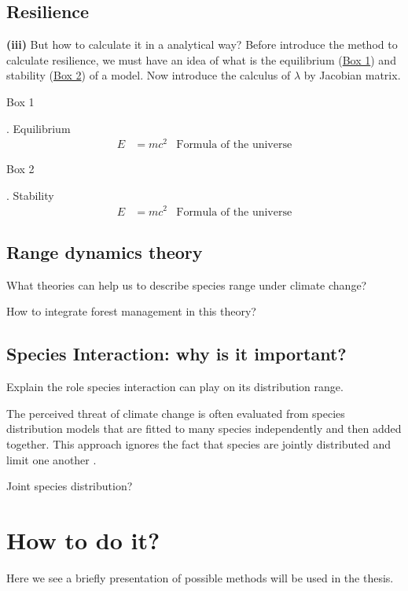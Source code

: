 \subsection*{Resilience}
\textbf{(iii)} But how to calculate it in a analytical way? Before introduce the method to calculate resilience, we must have an idea of what is the equilibrium (\hyperlink{box1}{Box 1}) and stability (\hyperlink{box2}{Box 2}) of a model. Now introduce the calculus of $\lambda$ by Jacobian matrix.

\begin{tcolorbox}
\hypertarget{box1}{Box 1}. Equilibrium
\begin{align}
E &= mc^2 & \text{Formula of the universe}
\end{align}
\end{tcolorbox}

\begin{tcolorbox}
\hypertarget{box2}{Box 2}. Stability
\begin{align}
E &= mc^2 & \text{Formula of the universe}
\end{align}
\end{tcolorbox}

\subsection*{Range dynamics theory}

What theories can help us to describe species range under climate change?

How to integrate forest management in this theory?

\subsection*{Species Interaction: why is it important?}
Explain the role species interaction can play on its distribution range.

The perceived threat of climate change is often evaluated from species distribution models that are fitted to many species independently and then added together. This approach ignores the fact that species are jointly distributed and limit one another \citep{clark2014}.

Joint species distribution?

\section{How to do it?}

Here we see a briefly presentation of possible methods will be used in the thesis.

